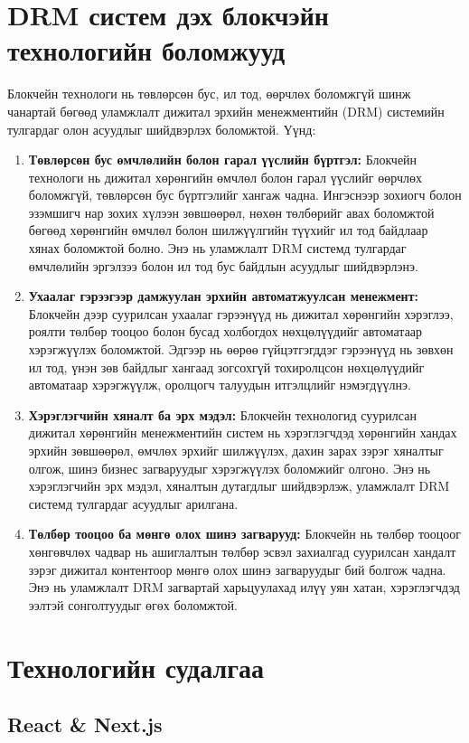 \section{DRM систем дэх блокчэйн технологийн боломжууд}
Блокчейн технологи нь төвлөрсөн бус, ил тод, өөрчлөх боломжгүй шинж чанартай бөгөөд уламжлалт дижитал эрхийн менежментийн (DRM) системийн тулгардаг олон асуудлыг шийдвэрлэх боломжтой. Үүнд:
\begin{enumerate}
   \item \textbf{Төвлөрсөн бус өмчлөлийн болон гарал үүслийн бүртгэл:} Блокчейн технологи нь дижитал хөрөнгийн өмчлөл болон гарал үүслийг өөрчлөх боломжгүй, төвлөрсөн бус бүртгэлийг хангаж чадна. Ингэснээр зохиогч болон эзэмшигч нар зохих хүлээн зөвшөөрөл, нөхөн төлбөрийг авах боломжтой бөгөөд хөрөнгийн өмчлөл болон шилжүүлгийн түүхийг ил тод байдлаар хянах боломжтой болно. Энэ нь уламжлалт DRM системд тулгардаг өмчлөлийн эргэлзээ болон ил тод бус байдлын асуудлыг шийдвэрлэнэ.
   \item \textbf{Ухаалаг гэрээгээр дамжуулан эрхийн автоматжуулсан менежмент:} Блокчейн дээр суурилсан ухаалаг гэрээнүүд нь дижитал хөрөнгийн хэрэглээ, роялти төлбөр тооцоо болон бусад холбогдох нөхцөлүүдийг автоматаар хэрэгжүүлэх боломжтой. Эдгээр нь өөрөө гүйцэтгэгддэг гэрээнүүд нь зөвхөн ил тод, үнэн зөв байдлыг хангаад зогсохгүй тохиролцсон нөхцөлүүдийг автоматаар хэрэгжүүлж, оролцогч талуудын итгэлцлийг нэмэгдүүлнэ.
   \item \textbf{Хэрэглэгчийн хяналт ба эрх мэдэл:}
   Блокчейн технологид суурилсан дижитал хөрөнгийн менежментийн систем нь хэрэглэгчдэд хөрөнгийн хандах эрхийн зөвшөөрөл, өмчлөх эрхийг шилжүүлэх, дахин зарах зэрэг хяналтыг олгож, шинэ бизнес загваруудыг хэрэгжүүлэх боломжийг олгоно. Энэ нь хэрэглэгчийн эрх мэдэл, хяналтын дутагдлыг шийдвэрлэж, уламжлалт DRM системд тулгардаг асуудлыг арилгана.
   \item \textbf{Төлбөр тооцоо ба мөнгө олох шинэ загварууд:}
   Блокчейн нь  төлбөр тооцоог хөнгөвчлөх чадвар нь ашиглалтын төлбөр эсвэл захиалгад суурилсан хандалт зэрэг дижитал контентоор мөнгө олох шинэ загваруудыг бий болгож чадна. Энэ нь уламжлалт DRM загвартай харьцуулахад илүү уян хатан, хэрэглэгчдэд ээлтэй сонголтуудыг өгөх боломжтой.
\end{enumerate}

\section{Технологийн судалгаа}
\subsection{React \& Next.js}
